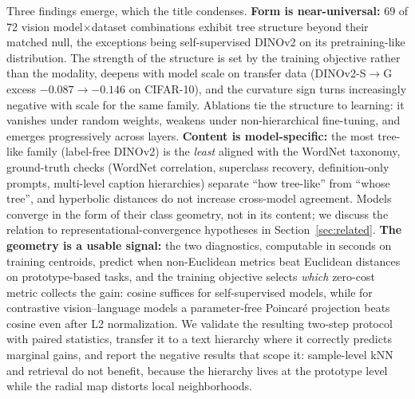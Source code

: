 \documentclass{article} %
\begin{document}
Three findings emerge, which the title condenses. \textbf{Form is near-universal:} 69 of 72 vision model$\times$dataset combinations exhibit tree structure beyond their matched null, the exceptions being self-supervised DINOv2 on its pretraining-like distribution. %
The strength of the structure is set by the training objective rather than the modality, deepens with model scale on transfer data (DINOv2-S$\to$G excess $-0.087\to-0.146$ on CIFAR-10), and the curvature sign turns increasingly negative with scale for the same family. %
Ablations tie the structure to learning: it vanishes under random weights, weakens under non-hierarchical fine-tuning, and emerges progressively across layers. \textbf{Content is model-specific:} the most tree-like family (label-free DINOv2) is the \emph{least} aligned with the WordNet taxonomy, ground-truth checks (WordNet correlation, superclass recovery, definition-only prompts, multi-level caption hierarchies) separate ``how tree-like'' from ``whose tree'', and hyperbolic distances do not increase cross-model agreement. Models converge in the form of their class geometry, not in its content; we discuss the relation to representational-convergence hypotheses in Section~\ref{sec:related}. \textbf{The geometry is a usable signal:} the two diagnostics, computable in seconds on training centroids, predict when non-Euclidean metrics beat Euclidean distances on prototype-based tasks, and the training objective selects \emph{which} zero-cost metric collects the gain: cosine suffices for self-supervised models, while for contrastive vision--language models a parameter-free Poincar\'{e} projection beats cosine even after L2 normalization. %
We validate the resulting two-step protocol with paired statistics, transfer it to a text hierarchy where it correctly predicts marginal gains, and report the negative results that scope it: sample-level kNN and retrieval do not benefit, because the hierarchy lives at the prototype level while the radial map distorts local neighborhoods.
\end{document}
